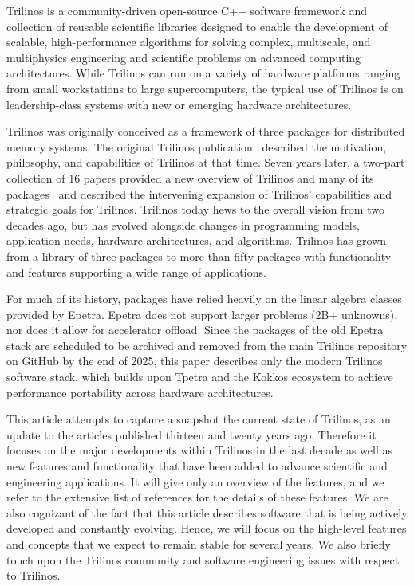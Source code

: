 
Trilinos is a community-driven open-source C++ software framework and collection of reusable scientific libraries designed to enable the development of scalable, high-performance algorithms for solving complex, multiscale, and multiphysics engineering and scientific problems on advanced computing architectures.
While Trilinos can run on a variety of hardware platforms ranging from small workstations to large supercomputers, the typical use of Trilinos is on leadership-class systems with new or emerging hardware architectures.

Trilinos was originally conceived as a framework of three packages for distributed memory systems. The original Trilinos publication~\cite{Heroux2005a} described the motivation, philosophy, and capabilities of Trilinos at that time. Seven years later, a two-part collection of 16 papers provided a new overview of Trilinos and many of its packages~\cite{Heroux2012,HerouxIntro2012part1,HerouxIntro2012part2,pawlowski2012automating,Oldfield2012,bochev2012,Boman2012,Baker2012,Kokkos2012,pawlowski2012automatingpart2,Spotz2012,Long2012,Morris2012,Howle2012,Bavier2012a,Gaidamour2012} and described the intervening expansion of Trilinos' capabilities and strategic goals for Trilinos. Trilinos today hews to the overall vision from two decades ago, but has evolved alongside changes in programming models, application needs, hardware architectures, and algorithms. Trilinos has grown from a library of three packages to more than fifty packages with functionality and features supporting a wide range of applications.

For much of its history, packages have relied heavily on the linear algebra classes provided by Epetra.
Epetra does not support larger problems (2B+ unknowns), nor does it allow for accelerator offload.
Since the packages of the old Epetra stack are scheduled to be archived and removed from the main Trilinos repository on GitHub by the end of 2025, this paper describes only the modern Trilinos software stack, which builds upon Tpetra and the Kokkos ecosystem to achieve performance portability across hardware architectures.

This article attempts to capture a snapshot the current state of Trilinos, as an update to the articles published thirteen and twenty years ago.
Therefore it focuses on the major developments within Trilinos in the last decade as well as new features and functionality that have been added to advance scientific and engineering applications.
It will give only an overview of the features, and we refer to the extensive list of references for the details of these features.
We are also cognizant of the fact that this article describes software that is being actively developed and constantly evolving.
Hence, we will focus on the high-level features and concepts that we expect to remain stable for several years.
We also briefly touch upon the Trilinos community 
and software engineering issues with respect to Trilinos.


